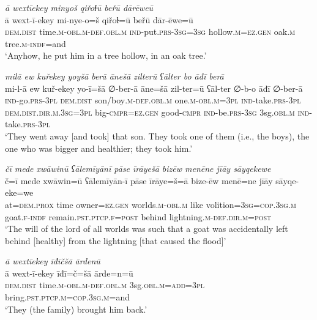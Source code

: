 \ea \label{ZB.38}
\textit{ā wextīekey minyoš qiřoɫū beřū dārēweū} \\ 
\gll ā wext-ī-ekey mi-nye-o=š qiřoɫ=ū beřū dār-ēwe=ū \\ 
 \textsc{dem.dist} time\textsc{.m}\textsc{-obl}\textsc{.m}\textsc{-def}\textsc{.obl}\textsc{.m} \textsc{ind-}put\textsc{.prs}\textsc{-3sg}\textsc{=3sg} hollow\textsc{.m}\textsc{\textsc{=ez.gen}} oak\textsc{.m} tree\textsc{.m}\textsc{-indf}=and \\ 
\glt `Anyhow, he put him in a tree hollow, in an oak tree.'
\z 
 
\ea \label{ZB.40}
\textit{milā ew kuřekey yoyšā berā ānešā zilterū ʕālter bo āđī berā} \\ 
\gll mi-l-ā ew kuř-ekey yo-ī=šā ∅-ber-ā āne=šā zil-ter=ū ʕāl-ter ∅-b-o āđī ∅-ber-ā \\ 
 \textsc{ind-}go\textsc{.prs}\textsc{-3pl} \textsc{dem.dist} son/boy\textsc{.m}\textsc{-def}\textsc{.obl}\textsc{.m} one\textsc{.m}\textsc{-obl}\textsc{.m}\textsc{=3pl} \textsc{ind-}take\textsc{.prs}\textsc{-3pl} \textsc{dem.dist}\textsc{.dir}\textsc{.m}\textsc{.3sg}\textsc{=3pl} big\textsc{-cmpr}\textsc{\textsc{=ez.gen}} good\textsc{-cmpr} \textsc{ind-}be\textsc{.prs}\textsc{-3sg} 3sg\textsc{.obl}\textsc{.m} \textsc{ind-}take\textsc{.prs}\textsc{-3pl} \\ 
\glt `They went away [and took] that son. They took one of them (i.e., the boys), the one who was bigger and healthier; they took him.'
\z 
 
\ea \label{ZB.42}
\textit{čī mede xwāwinū ʕālemīyānī pāse īrāyešā bizēw menēne jīāy sāyqekewe} \\ 
\gll č=ī mede xwāwin=ū ʕālemīyān-ī pāse īrāye=š=ā bize-ēw menē=ne jīāy sāyqe-eke=we \\ 
 at=\textsc{dem.prox} time owner\textsc{\textsc{=ez.gen}} worlds\textsc{.m}\textsc{-obl}\textsc{.m} like volition\textsc{=3sg}\textsc{=cop}\textsc{.3sg}\textsc{.m} goat\textsc{.f}\textsc{-indf} remain\textsc{.pst}\textsc{.ptcp}\textsc{.f}\textsc{=\textsc{post}} behind lightning\textsc{.m}\textsc{-def}\textsc{.dir}\textsc{.m}\textsc{=\textsc{post}} \\ 
\glt `The will of the lord of all worlds was such that a goat was accidentally left behind [healthy] from the lightning [that caused the flood]'
\z 
 
\ea \label{ZB.50}
\textit{ā wextīekey īđīčšā ārdenū} \\ 
\gll ā wext-ī-ekey īđī=č=šā ārde=n=ū \\ 
 \textsc{dem.dist} time\textsc{.m}\textsc{-obl}\textsc{.m}\textsc{-def}\textsc{.obl}\textsc{.m} 3sg\textsc{.obl}\textsc{.m}\textsc{=add}\textsc{=3pl} bring\textsc{.pst}\textsc{.ptcp}\textsc{.m}\textsc{=cop}\textsc{.3sg}\textsc{.m}=and \\ 
\glt `They (the family) brought him back.'
\z 
 
